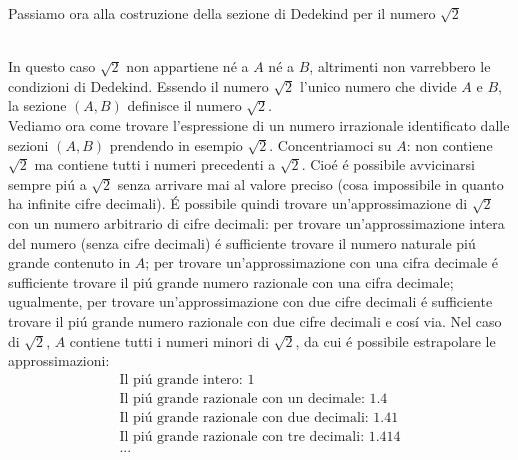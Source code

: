 \documentclass[twoside]{article} %
\begin{document}
	\newpage
	\noindent Passiamo ora alla costruzione della sezione di Dedekind per il numero $\sqrt{2}$\\
	\\
	In questo caso $\sqrt{2}$ non appartiene n\'e a $A$ n\'e a $B$, altrimenti non varrebbero le condizioni di Dedekind. Essendo il numero $\sqrt{2}$ l'unico numero che divide $A$ e $B$, la sezione $(A,B)$ definisce il numero $\sqrt{2}$.\\
	Vediamo ora come trovare l'espressione di un numero irrazionale identificato dalle sezioni $(A,B)$ prendendo in esempio $\sqrt{2}$. Concentriamoci su $A$: non contiene $\sqrt{2}$ ma contiene tutti i numeri precedenti a $\sqrt{2}$. Cio\'e \'e possibile avvicinarsi sempre pi\'u a $\sqrt{2}$ senza arrivare mai al valore preciso (cosa impossibile in quanto ha infinite cifre decimali). \'E possibile quindi trovare un'approssimazione di $\sqrt{2}$ con un numero arbitrario di cifre decimali: per trovare un'approssimazione intera del numero (senza cifre decimali) \'e sufficiente trovare il numero naturale pi\'u grande contenuto in $A$; per trovare un'approssimazione con una cifra decimale \'e sufficiente trovare il pi\'u grande numero razionale con una cifra decimale; ugualmente, per trovare un'approssimazione con due cifre decimali \'e sufficiente trovare il pi\'u grande numero razionale con due cifre decimali e cos\'i via. Nel caso di $\sqrt{2}$, $A$ contiene tutti i numeri minori di $\sqrt{2}$, da cui \'e possibile estrapolare le approssimazioni:
	\begin{gather*}
		\text{Il pi\'u grande intero: } 1\\
		\text{Il pi\'u grande razionale con un decimale: } 1.4\\
		\text{Il pi\'u grande razionale con due decimali: } 1.41\\
		\text{Il pi\'u grande razionale con tre decimali: } 1.414\\
		...
	\end{gather*}
\end{document}

